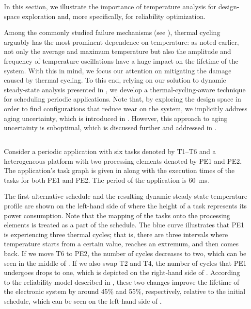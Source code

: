 In this section, we illustrate the importance of temperature analysis for
design-space exploration and, more specifically, for reliability optimization.

Among the commonly studied failure mechanisms (see ),
thermal cycling arguably has the most prominent dependence on temperature: as
noted earlier, not only the average and maximum temperature but also the
amplitude and frequency of temperature oscillations have a huge impact on the
lifetime of the system. With this in mind, we focus our attention on mitigating
the damage caused by thermal cycling. To this end, relying on our solution to
dynamic steady-state analysis presented in , we
develop a thermal-cycling-aware technique for scheduling periodic applications.
Note that, by exploring the design space in order to find configurations that
reduce wear on the system, we implicitly address aging uncertainty, which is
introduced in . However, this approach to aging
uncertainty is suboptimal, which is discussed further and addressed in
.

\subsection{\motivationtitle}

Consider a periodic application with six tasks denoted by T1--T6 and a
heterogeneous platform with two processing elements denoted by PE1 and PE2. The
application's task graph is given in  along with
the execution times of the tasks for both PE1 and PE2. The period of the
application is 60~ms.

The first alternative schedule and the resulting dynamic steady-state
temperature profile are shown on the left-hand side of
 where the height of a task represents its power
consumption. Note that the mapping of the tasks onto the processing elements is
treated as a part of the schedule. The blue curve illustrates that PE1 is
experiencing three thermal cycles; that is, there are three intervals where
temperature starts from a certain value, reaches an extremum, and then comes
back. If we move T6 to PE2, the number of cycles decreases to two, which can be
seen in the middle of . If we also swap T2 and
T4, the number of cycles that PE1 undergoes drops to one, which is depicted on
the right-hand side of . According to the
reliability model described in , these two changes
improve the lifetime of the electronic system by around 45\% and 55\%,
respectively, relative to the initial schedule, which can be seen on the
left-hand side of .

